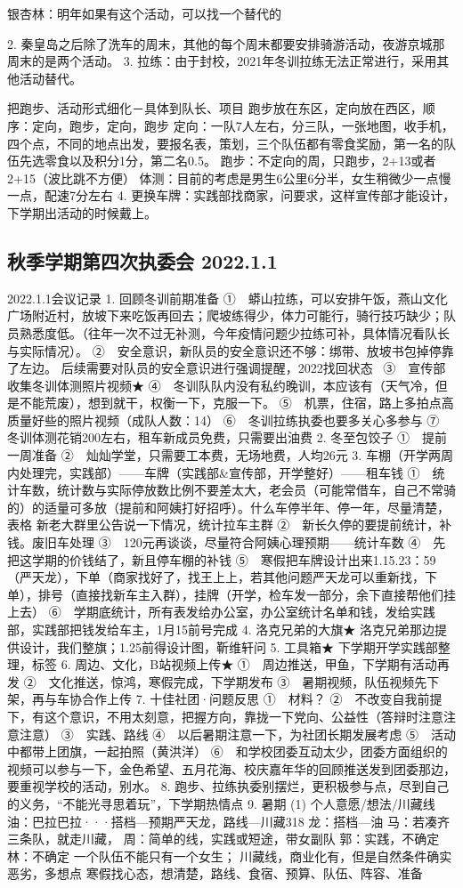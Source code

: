 \documentclass{ctexbook}
\begin{document}
银杏林：明年如果有这个活动，可以找一个替代的 

2. 秦皇岛之后除了洗车的周末，其他的每个周末都要安排骑游活动，夜游京城那周末的是两个活动。 3. 拉练：由于封校，2021年冬训拉练无法正常进行，采用其他活动替代。

把跑步、活动形式细化－具体到队长、项目 跑步放在东区，定向放在西区，顺序：定向，跑步，定向，跑步 定向：一队7人左右，分三队，一张地图，收手机，四个点，不同的地点出发，要报名表，策划，三个队伍都有零食奖励，第一名的队伍先选零食以及积分1分，第二名0.5。 跑步：不定向的周，只跑步，2+13或者2+15（波比跳不方便） 体测：目前的考虑是男生6公里6分半，女生稍微少一点慢一点，配速7分左右 4. 更换车牌：实践部找商家，问要求，这样宣传部才能设计，下学期出活动的时候戴上。
 
\subsection{秋季学期第四次执委会 2022.1.1}
2022.1.1会议记录
1.	回顾冬训前期准备
①　蟒山拉练，可以安排午饭，燕山文化广场附近村，放坡下来吃饭再回去；爬坡练得少，体力可能行，骑行技巧缺少；队员熟悉度低。（往年一次不过无补测，今年疫情问题少拉练可补，具体情况看队长与实际情况）。
②　安全意识，新队员的安全意识还不够：绑带、放坡书包掉停靠了左边。   
后续需要对队员的安全意识进行强调提醒，2022找回状态~
③　宣传部收集冬训体测照片视频★
④　冬训队队内没有私约晚训，本应该有（天气冷，但是不能荒废），想到就干，权衡一下，克服一下。
⑤　机票，住宿，路上多拍点高质量好些的照片视频（成队人数：14）
⑥　冬训拉练执委也要多关心多参与
⑦　冬训体测花销200左右，租车新成员免费，只需要出油费
2.	冬至包饺子
①　提前一周准备
②　灿灿学堂，只需要工本费，无场地费，人均26元
3.	车棚（开学两周内处理完，实践部）——车牌（实践部\&宣传部，开学整好）——租车钱
①　统计车数，统计数与实际停放数比例不要差太大，老会员（可能常借车，自己不常骑的）的适量可多放（提前和阿姨打好招呼）。什么车停半年、停一年，尽量清楚，表格
新老大群里公告说一下情况，统计拉车主群
②　新长久停的要提前统计，补钱。废旧车处理
③　120元再谈谈，尽量符合阿姨心理预期——统计车数
④　先把这学期的价钱结了，新且停车棚的补钱
⑤　寒假把车牌设计出来1.15.23：59（严天龙），下单（商家找好了，找王上上，若其他问题严天龙可以重新找，下单），排号（直接找新车主入群），挂牌（开学，检车发一部分，余下直接帮他们挂上去）
⑥　学期底统计，所有表发给办公室，办公室统计名单和钱，发给实践部，实践部把钱发给车主，1月15前号完成
4.	洛克兄弟的大旗★
洛克兄弟那边提供设计，我们整旗；1.25前得设计图，靳维轩问
5.	工具箱★
下学期开学实践部整理，标签
6.	周边、文化，B站视频上传★
①　周边推送，甲鱼，下学期有活动再发
②　文化推送，惊鸿，寒假完成，下学期发布
③　暑期视频，队伍视频先下架，再与车协合作上传
7.	十佳社团·问题反思
①　材料？
②　不改变自我前提下，有这个意识，不用太刻意，把握方向，靠拢一下党向、公益性（答辩时注意注意注意）
③　实践、路线
④　以后暑期注意一下，为社团长期发展考虑
⑤　活动中都带上团旗，一起拍照（黄洪洋）
⑥　和学校团委互动太少，团委方面组织的视频可以参与一下，金色希望、五月花海、校庆嘉年华的回顾推送发到团委那边，要重视学校的活动，别水。
8.	跑步、拉练执委别摆烂，更积极参与点，尽到自己的义务，“不能光寻思着玩”，下学期热情点
9.	暑期
(1)	个人意愿/想法/川藏线
油：巴拉巴拉···搭档—预期严天龙，路线—川藏318
龙：搭档—油
马：若凑齐三条队，就走川藏，
周：简单的线，实践或短途，带女副队
郭：实践，不确定
林：不确定
一个队伍不能只有一个女生；
川藏线，商业化有，但是自然条件确实恶劣，多想点
寒假找心态，想清楚，路线、食宿、预算、队伍、阵容、准备
\end{document}
